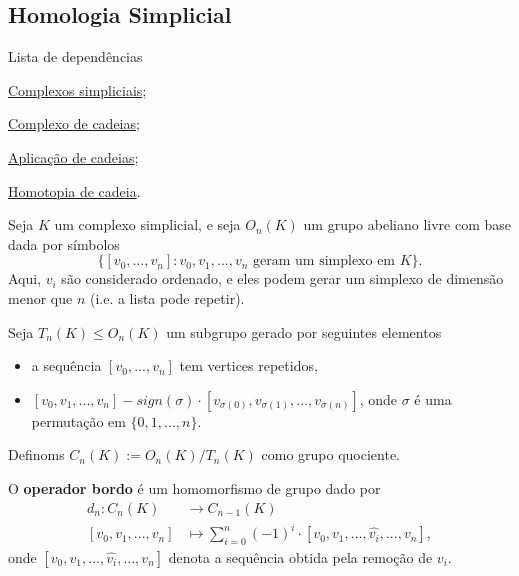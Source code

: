 \subsection{Homologia Simplicial}
\label{homologia-simplicial-def}
\begin{titlemize}{Lista de dependências}
    \item \hyperref[complexo-simplicial-def]{Complexos simpliciais};\\
	\item \hyperref[complexo-de-cadeias-def]{Complexo de cadeias};\\ 
    \item \hyperref[aplicacao-de-cadeias-def]{Aplicação de cadeias};\\
    \item \hyperref[homotopia-de-cadeias-def]{Homotopia de cadeia}.
\end{titlemize}
\begin{defi}
	Seja $K$ um complexo simplicial, e seja $O_n (K)$ um grupo abeliano livre com base dada por símbolos 
    \[\{[v_0,...,v_n]:v_0,v_1,...,v_n \text{ geram um simplexo em }K\}.\]
    Aqui, $v_i$ são considerado ordenado, e eles podem gerar um simplexo de dimensão menor que $n$ (i.e. a lista pode repetir).

    Seja $T_n(K)\le O_n(K)$ um subgrupo gerado por seguintes elementos 
    \begin{itemize}
        \item a sequência $[v_0,...,v_n]$ tem vertices repetidos,
        \item $[v_0,v_1,...,v_n]-sign(\sigma)\cdot[v_{\sigma(0)},v_{\sigma(1)},...,v_{\sigma(n)}]$, onde $\sigma$ é uma permutação em $\{0,1,...,n\}$. 
    \end{itemize}
    Definoms $C_n(K):=O_n(K)/T_n(K)$ como grupo quociente.
\end{defi}

\begin{defi}
    O \textbf{operador bordo} é um homomorfismo de grupo dado por 
    \begin{align*}
        d_n:C_n(K)&\longrightarrow C_{n-1}(K)\\
        [v_0,v_1,...,v_n]&\longmapsto \sum_{i=0}^n (-1)^i \cdot[v_0,v_1,...,\widehat{v_i},...,v_n],
    \end{align*}
    onde $[v_0,v_1,...,\widehat{v_i},...,v_n]$ denota a sequência obtida pela remoção de $v_i$.
\end{defi}

